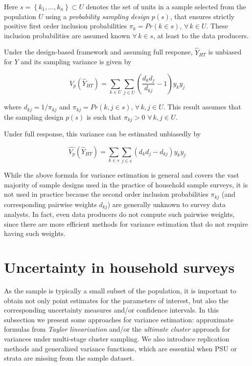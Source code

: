 \documentclass[
  12pt,
]{book}
\begin{document}
Here \(s = \left\{ k_1, \ldots, k_n \right\} \subset U\) denotes the set of units in a sample selected from the population \(U\) using a \emph{probability sampling design} \(p(s)\), that ensures strictly positive first order inclusion probabilities \(\pi_k = Pr(k \in s), \, \forall \, k \in U\). These inclusion probabilities are assumed known \(\forall \, k \in s\), at least to the data producers.

Under the design-based framework and assuming full response, \(\widehat Y _{HT}\) is unbiased for \(Y\) and its sampling variance is given by

\[
V_p \left( \widehat{Y}_{HT} \right) = \sum_{k \in U} \sum_{j \in U} \left( \frac {d_k d_j} {d_{kj}} - 1 \right) y_k y_j
\]

where \(d_{kj} = 1 / \pi_{kj}\) and \(\pi_{kj} = Pr(k,j \in s), \, \forall \, k,j \in U\). This result assumes that the sampling design \(p(s)\) is such that \(\pi_{kj} > 0 \,\, \forall \, k,j \in U\).

Under full response, this variance can be estimated unbiasedly by

\[
\widehat {V_p} \left( \widehat{Y}_{HT} \right) = \sum_{k \in s} \sum_{j \in s} \left( d_k d_j - d_{kj} \right) y_k y_j
\]

While the above formula for variance estimation is general and covers the vast majority of sample designs used in the practice of household sample surveys, it is not used in practice because the second order inclusion probabilities \(\pi_{kj}\) (and corresponding pairwise weights \(d_{kj}\)) are generally unknown to survey data analysts. In fact, even data producers do not compute such pairwise weights, since there are more efficient methods for variance estimation that do not require having such weights.

\hypertarget{uncertainty-in-household-surveys}{%
\section{Uncertainty in household surveys}\label{uncertainty-in-household-surveys}}

As the sample is typically a small subset of the population, it is important to obtain not only point estimates for the parameters of interest, but also the corresponding uncertainty measures and/or confidence intervals. In this subsection we present some approaches for variance estimation: approximate formulas from \emph{Taylor linearization} and/or the \emph{ultimate cluster} approach for variances under multi-stage cluster sampling. We also introduce replication methods and generalized variance functions, which are essential when PSU or strata are missing from the sample dataset.
\end{document}
